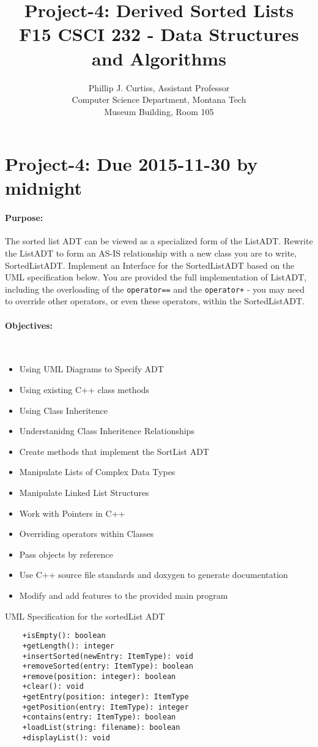\documentclass[10pt,letterpaper]{article}
\title{Project-4: Derived Sorted Lists \\
	   F15 CSCI 232 - Data Structures and Algorithms}
\author{Phillip J. Curtiss, Assistant Professor\\
	    Computer Science Department, Montana Tech\\
		Museum Building, Room 105}
\newcounter{x}\setcounter{x}{1}
\begin{document}
\pagestyle{fancy}
\maketitle
\thispagestyle{empty}

\section*{Project-4: Due 2015-11-30 by midnight}

\paragraph{Purpose:} The sorted list ADT can be viewed as a specialized form of the ListADT. Rewrite the ListADT to form an AS-IS relationship with a new class you are to write, SortedListADT. Implement an Interface for the SortedListADT based on the UML specification below. You are provided the full implementation of ListADT, including the overloading of the \verb|operator==| and the \verb|operator+| - you may need to override other operators, or even these operators, within the SortedListADT. 

\paragraph{Objectives:} ~
\begin{itemize}
	\item Using UML Diagrams to Specify ADT
	\item Using existing C++ class methods
	\item Using Class Inheritence 
	\item Understanidng Class Inheritence Relationships
	\item Create methods that implement the SortList ADT
	\item Manipulate Lists of Complex Data Types
	\item Manipulate Linked List Structures
	\item Work with Pointers in C++
	\item Overriding operators within Classes
	\item Pass objects by reference
	\item Use C++ source file standards and doxygen to generate documentation
	\item Modify and add features to the provided main program
\end{itemize}

\begin{table}
\caption{UML Specification for the sortedList ADT} \label{uml:adtList}
\begin{lstlisting}
	+isEmpty(): boolean
	+getLength(): integer
	+insertSorted(newEntry: ItemType): void
	+removeSorted(entry: ItemType): boolean
	+remove(position: integer): boolean
	+clear(): void
	+getEntry(position: integer): ItemType
	+getPosition(entry: ItemType): integer
	+contains(entry: ItemType): boolean
	+loadList(string: filename): boolean
	+displayList(): void
\end{lstlisting}
\end{table}
\end{document}

